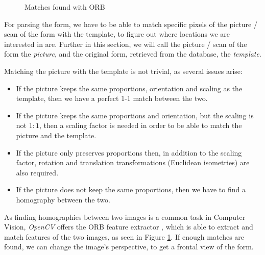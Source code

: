 \documentclass[11pt, a4paper]{report}
\begin{document}
 \begin{figure}[!h]
     \centering
     \caption{Matches found with ORB}
     \label{orb-matches}
 \end{figure}

For parsing the form, we have to be able to match specific pixels of the picture / scan of the form with the template, to figure out where locations we are interested in are. Further in this section, we will call the picture / scan of the form the \textit{picture}, and the original form, retrieved from the database, the \textit{template}.

Matching the picture with the template is not trivial, as several issues arise:
\begin{itemize}
    \item If the picture keeps the same proportions, orientation and scaling as the template, then we have a perfect 1-1 match between the two.
    \item If the picture keeps the same proportions and orientation, but the scaling is not $1:1$, then a scaling factor is needed in order to be able to match the picture and the template.
    \item If the picture only preserves proportions then, in addition to the scaling factor,  rotation and translation transformations (Euclidean isometries) are also required.
    \item If the picture does not keep the same proportions, then we have to find a homography between the two.
\end{itemize}

As finding homographies between two images is a common task in Computer Vision, \textit{OpenCV} offers the ORB feature extractor \cite{rublee2011orb}, which is able to extract and match features of the two images, as seen in Figure \ref{orb-matches}. If enough matches are found, we can change the image's perspective, to get a frontal view of the form.
\end{document}
